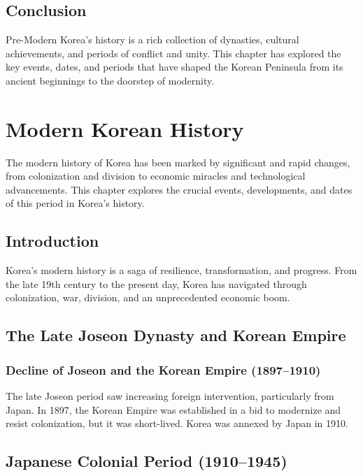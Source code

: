 \documentclass[a4paper,12pt]{book}
\begin{document}
\section{Conclusion}
\label{sec:conclusion-pre-modern-korea}
Pre-Modern Korea's history is a rich collection of dynasties, cultural achievements, and periods of conflict and unity. This chapter has explored the key events, dates, and periods that have shaped the Korean Peninsula from its ancient beginnings to the doorstep of modernity.

\chapter{Modern Korean History}
\label{ch:modern-korean-history}

The modern history of Korea has been marked by significant and rapid changes, from colonization and division to economic miracles and technological advancements. This chapter explores the crucial events, developments, and dates of this period in Korea’s history.

\section{Introduction}
\label{sec:introduction-modern-korea}
Korea’s modern history is a saga of resilience, transformation, and progress. From the late 19th century to the present day, Korea has navigated through colonization, war, division, and an unprecedented economic boom.

\section{The Late Joseon Dynasty and Korean Empire}
\label{sec:late-joseon-korean-empire}

\subsection{Decline of Joseon and the Korean Empire (1897–1910)}
\label{subsec:decline-joseon-korean-empire}
The late Joseon period saw increasing foreign intervention, particularly from Japan. In 1897, the Korean Empire was established in a bid to modernize and resist colonization, but it was short-lived. Korea was annexed by Japan in 1910.

\section{Japanese Colonial Period (1910–1945)}
\label{sec:japanese-colonial-period}
\end{document}
